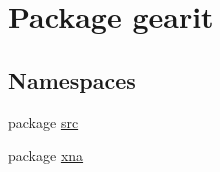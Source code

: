 \hypertarget{namespacegearit}{\section{Package gearit}
\label{namespacegearit}
}
\subsection*{Namespaces}
\begin{DoxyCompactItemize}
\item 
package \hyperlink{namespacegearit_1_1src}{src}
\item 
package \hyperlink{namespacegearit_1_1xna}{xna}
\end{DoxyCompactItemize}
